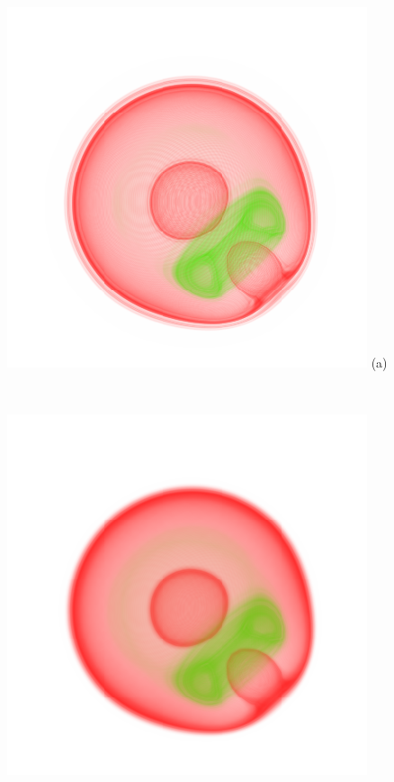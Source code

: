 \documentclass[twoside,twocolumn,10pt]{article}
\begin{document}
\begin{figure}
	\centering
	\begin{minipage}{.2\textwidth}
		\centering
		\includegraphics[width=1\linewidth]{crop/nucleon_merged_green_red}
		(a)
	\end{minipage}~
	\begin{minipage}{.2\textwidth}
		\centering
		\includegraphics[width=1\linewidth]{crop/nucleon_merged_segment_green_red}

\end{minipage}
\end{figure}
\end{document}
